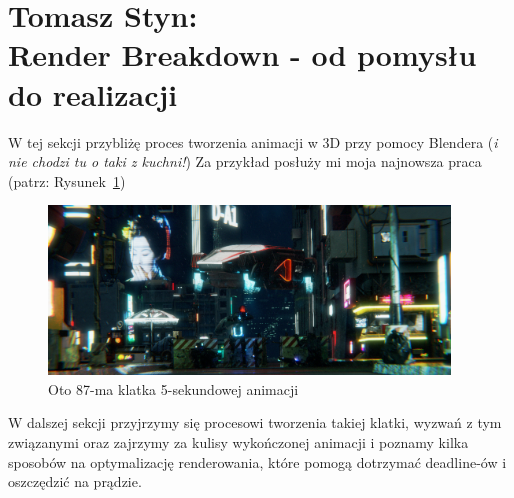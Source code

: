 \section{Tomasz Styn: \texorpdfstring{\\Render Breakdown - od pomysłu do realizacji}{}} %
\label{sec:tstyn}

W tej sekcji przybliżę proces tworzenia animacji w 3D przy pomocy Blendera (\textit{i nie chodzi tu o taki z kuchni!}) Za przykład posłuży mi moja najnowsza praca (patrz: Rysunek~\ref{fig:render_frame})\vspace{2ex} %

\begin{figure}[htbp]
    \centering
    \includegraphics[width=0.95\textwidth]{pictures/Tomek/render_frame.png}
    \caption{Oto 87-ma klatka 5-sekundowej animacji}
    \label{fig:render_frame}
\end{figure}
\vspace{3ex}
W dalszej sekcji przyjrzymy się procesowi tworzenia takiej klatki, wyzwań z tym związanymi oraz zajrzymy za kulisy wykończonej animacji i poznamy kilka sposobów na optymalizację renderowania, które pomogą dotrzymać deadline-ów i oszczędzić na prądzie.

\newpage
